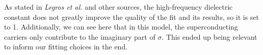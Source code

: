 As stated in \textit{Legros et al.} and other sources, 
the high-frequency dielectric constant does not greatly improve the quality of the fit and its results, so it is set to 1.
Additionally, we can see here that in this model, the superconducting carriers only contribute to the imaginary part of $\sigma$. 
This ended up being relevant to inform our fitting choices in the end.


